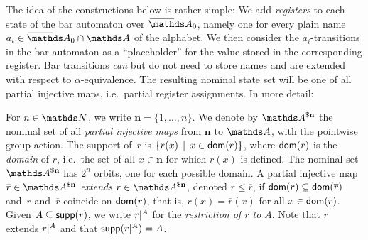 \documentclass[a4paper,UKenglish,cleveref,autoref,thm-restate,numberwithinsect,final]{lipics-v2021}
\begin{document}
    The idea of the constructions below is rather simple: We add \emph{registers} to each state of the bar automaton
    over $\barNames_0$, namely one for every plain name $a_i \in \barNames_0 \cap \names$ of the alphabet.
    We then consider the $a_i$-transitions in the bar automaton as a \enquote{placeholder} for the value stored
    in the corresponding register.
    Bar transitions \emph{can} but do not need to store names and are extended with respect to $\alpha$-equivalence.
    The resulting nominal state set will be one of all partial injective maps, i.e.~partial register assignments.
    In more detail:

    \begin{defn}\label{defn:dollar}
      For $n\in\Nat$, we write $\mathbf{n}=\{1,\dots,n\}$. We denote by
      $\parnom{n}$ the nominal set of all \emph{partial injective maps}
      from $\mathbf{n}$ to $\names$, with the pointwise group action.  The
      support of~$r$ is $\{r(x)\,\mid\,x \in \operatorname{\textsf{dom}}(r)\}$, where $\operatorname{\textsf{dom}}(r)$ is
      the \emph{domain} of $r$, i.e.~the set of all $x \in \mathbf{n}$ for
      which $r(x)$ is defined. The nominal set
      $\parnom{n}$ has $2^{n}$ orbits, one for each possible
      domain. A partial injective map
      $\overline{r} \in \parnom{n}$ \emph{extends} $r \in \parnom{n}$, denoted
      $r \leqslant \overline{r}$, if
      $\operatorname{\textsf{dom}}(r) \subseteq \operatorname{\textsf{dom}}(\overline{r})$ and~$r$ and~$\overline{r}$
      coincide on $\operatorname{\textsf{dom}}(r)$, that is, $r(x) = \overline{r}(x)$ for all
      $x \in \operatorname{\textsf{dom}}(r)$.  Given $A \subseteq \operatorname{\mathsf{supp}}(r)$, we write $\restr{r}{A}$
      for the \emph{restriction of $r$ to $A$}. Note that $r$ extends
      $\restr{r}{A}$ and that $\supp(\restr{r}{A}) = A$. 
    \end{defn}
\end{document}
